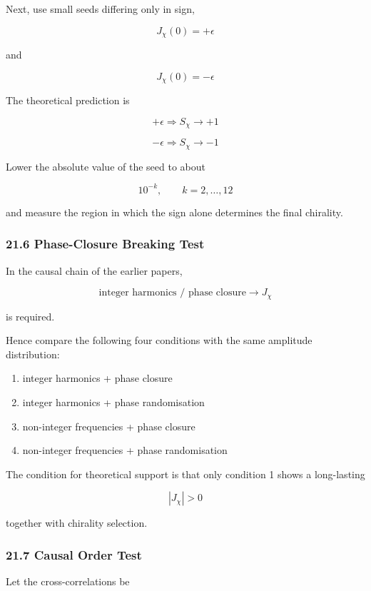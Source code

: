 \documentclass[
  a4paper,
]{article}
\providecommand{\tightlist}{%
  \setlength{\itemsep}{0pt}\setlength{\parskip}{0pt}}
\begin{document}
Next, use small seeds differing only in sign,

\[
J_\chi(0)=+\epsilon
\]

and

\[
J_\chi(0)=-\epsilon
\]

The theoretical prediction is

\[
\boxed{
+\epsilon
\Longrightarrow
S_\chi\to+1
}
\tag{186}
\]

\[
\boxed{
-\epsilon
\Longrightarrow
S_\chi\to-1
}
\tag{187}
\]

Lower the absolute value of the seed to about

\[
10^{-k},
\qquad
k=2,\ldots,12
\]

and measure the region in which the sign alone determines the final
chirality.

\subsubsection{21.6 Phase-Closure Breaking
Test}\label{phase-closure-breaking-test}

In the causal chain of the earlier papers,

\[
\text{integer harmonics / phase closure}
\to
J_\chi
\]

is required.

Hence compare the following four conditions with the same amplitude
distribution:

\begin{enumerate}
\def\labelenumi{\arabic{enumi}.}
\tightlist
\item
  integer harmonics + phase closure
\item
  integer harmonics + phase randomisation
\item
  non-integer frequencies + phase closure
\item
  non-integer frequencies + phase randomisation
\end{enumerate}

The condition for theoretical support is that only condition 1 shows a
long-lasting

\[
|J_\chi|>0
\]

together with chirality selection.

\subsubsection{21.7 Causal Order Test}\label{causal-order-test}

Let the cross-correlations be
\end{document}
